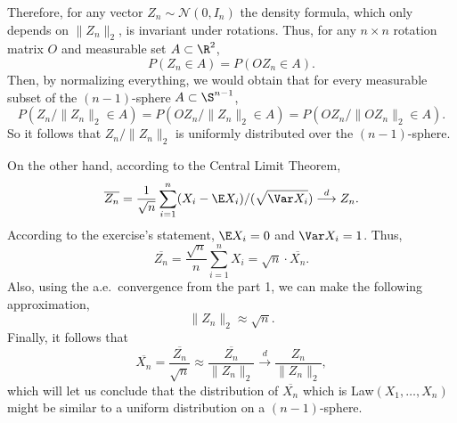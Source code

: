 Therefore, for any vector $Z_n \sim \mathcal{N}(0,I_n)$ the density formula, which only depends on $\|Z_n\|_2$, is invariant under rotations. Thus, for any $n\times n$ rotation matrix $O$ and measurable set $A \subset \R^2$,
\[ P(Z_n \in A) = P(OZ_n \in A) . \]
Then, by normalizing everything, we would obtain that for every measurable subset of the $(n-1)$-sphere $A\subset \S^{n-1}$,
\[ P(Z_n/\|Z_n\|_2 \in A) = P(OZ_n/\|Z_n\|_2 \in A) = P(OZ_n/\|OZ_n\|_2 \in A). \]
So it follows that $Z_n/\|Z_n\|_2$ is uniformly distributed over the $(n-1)$-sphere.

On the other hand, according to the Central Limit Theorem,
\[ \overline{Z_n} = \frac{1}{\sqrt{n}}\sum_{i = 1}^n (X_i - \E X_i)/(\sqrt{\Var X_i}) \overset{d}{\longrightarrow} Z_n.\]
According to the exercise's statement, $\E X_i = 0$ and $\Var X_i = 1$. Thus,
\[ \overline{Z_n} = \frac{\sqrt{n}}{n}\sum_{i = 1}^n X_i = \sqrt{n} \cdot \overline{X_n}. \]
Also, using the a.e.~convergence from the part 1, we can make the following approximation,
\[ \|Z_n\|_2 \approx \sqrt{n}. \]
Finally, it follows that
\[ \overline{X_n} = \frac{\overline{Z_n}}{\sqrt{n}} \approx \frac{\overline{Z_n}}{\|Z_n\|_2} \overset{d}{\longrightarrow} \frac{Z_n}{\|Z_n\|_2},  \]
which will let us conclude that the distribution of $\overline{X_n}$ which is Law$(X_1,\ldots,X_n)$ might be similar to a uniform distribution on a $(n-1)$-sphere.

